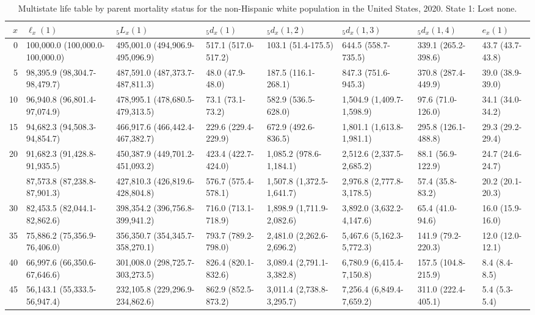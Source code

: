 \begin{table}

\caption{Multistate life table by parent mortality status for the non-Hispanic white population in the United States, 2020. State 1: Lost none.}
\centering
\begin{tabular}[t]{rlllllll}
\toprule
$x$ & $\ell_x(1)$ & ${}_5 L_x(1)$ & ${}_5 d_x(1)$ & ${}_5 d_x(1,2)$ & ${}_5 d_x(1,3)$ & ${}_5 d_x(1,4)$ & $e_x(1)$\\
\midrule
0 & 100,000.0 (100,000.0-100,000.0) & 495,001.0 (494,906.9-495,096.9) & 517.1 (517.0-517.2) & 103.1 (51.4-175.5) & 644.5 (558.7-735.5) & 339.1 (265.2-398.6) & 43.7 (43.7-43.8)\\
5 & 98,395.9 (98,304.7-98,479.7) & 487,591.0 (487,373.7-487,811.3) & 48.0 (47.9-48.0) & 187.5 (116.1-268.1) & 847.3 (751.6-945.3) & 370.8 (287.4-449.9) & 39.0 (38.9-39.0)\\
10 & 96,940.8 (96,801.4-97,074.9) & 478,995.1 (478,680.5-479,313.5) & 73.1 (73.1-73.2) & 582.9 (536.5-628.0) & 1,504.9 (1,409.7-1,598.9) & 97.6 (71.0-126.0) & 34.1 (34.0-34.2)\\
15 & 94,682.3 (94,508.3-94,854.7) & 466,917.6 (466,442.4-467,382.7) & 229.6 (229.4-229.9) & 672.9 (492.6-836.5) & 1,801.1 (1,613.8-1,981.1) & 295.8 (126.1-488.8) & 29.3 (29.2-29.4)\\
20 & 91,682.3 (91,428.8-91,935.5) & 450,387.9 (449,701.2-451,093.2) & 423.4 (422.7-424.0) & 1,085.2 (978.6-1,184.1) & 2,512.6 (2,337.5-2,685.2) & 88.1 (56.9-122.9) & 24.7 (24.6-24.7)\\
\addlinespace
25 & 87,573.8 (87,238.8-87,901.3) & 427,810.3 (426,819.6-428,804.8) & 576.7 (575.4-578.1) & 1,507.8 (1,372.5-1,641.7) & 2,976.8 (2,777.8-3,178.5) & 57.4 (35.8-83.2) & 20.2 (20.1-20.3)\\
30 & 82,453.5 (82,044.1-82,862.6) & 398,354.2 (396,756.8-399,941.2) & 716.0 (713.1-718.9) & 1,898.9 (1,711.9-2,082.6) & 3,892.0 (3,632.2-4,147.6) & 65.4 (41.0-94.6) & 16.0 (15.9-16.0)\\
35 & 75,886.2 (75,356.9-76,406.0) & 356,350.7 (354,345.7-358,270.1) & 793.7 (789.2-798.0) & 2,481.0 (2,262.6-2,696.2) & 5,467.6 (5,162.3-5,772.3) & 141.9 (79.2-220.3) & 12.0 (12.0-12.1)\\
40 & 66,997.6 (66,350.6-67,646.6) & 301,008.0 (298,725.7-303,273.5) & 826.4 (820.1-832.6) & 3,089.4 (2,791.1-3,382.8) & 6,780.9 (6,415.4-7,150.8) & 157.5 (104.8-215.9) & 8.4 (8.4-8.5)\\
45 & 56,143.1 (55,333.5-56,947.4) & 232,105.8 (229,296.9-234,862.6) & 862.9 (852.5-873.2) & 3,011.4 (2,738.8-3,295.7) & 7,256.4 (6,849.4-7,659.2) & 311.0 (222.4-405.1) & 5.4 (5.3-5.4)\\

\end{tabular}
\end{table}
